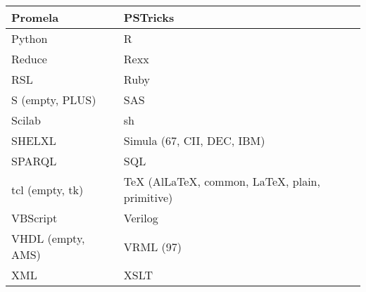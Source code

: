 \begin{center}
\begin{longtable}{l|l}
		\hline
		Promela	& PSTricks\\
		\hline
		Python	& R\\
		\hline
		Reduce	& Rexx\\
		\hline
		RSL	& Ruby\\
		\hline
		S (empty, PLUS)	& SAS\\
		\hline
		Scilab	& sh\\
		\hline
		SHELXL	& Simula (67, CII, DEC, IBM)\\
		\hline
		SPARQL	& SQL\\
		\hline
		tcl (empty, tk)	& TeX (AlLaTeX, common, LaTeX, plain, primitive)\\
		\hline
		VBScript	& Verilog\\
		\hline
		VHDL (empty, AMS)	& VRML (97)\\
		\hline
		XML	& XSLT\\
		\hline
	\end{longtable}
\end{center}

